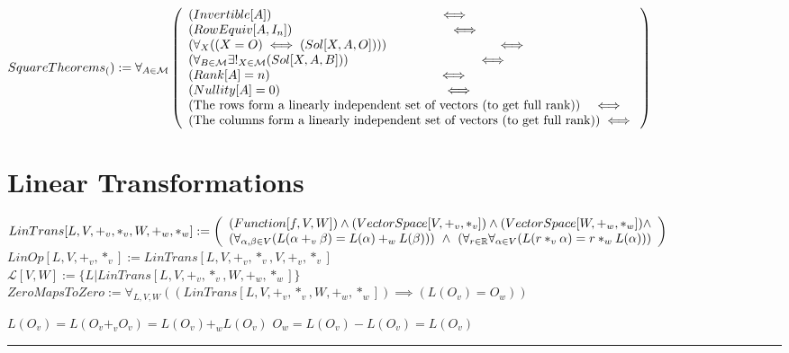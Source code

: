 \documentclass{book}
\newcommand{\abr}{:=}
\begin{document}
$SquareTheorems_() \abr \forall_{A \in \mathcal{M}}\left(\begin{array}{ll}
  (Invertible[A]) \hfill \iff \hfill \\
  (RowEquiv[A, I_n]) \hfill \iff \hfill \\
  (\forall_{X}((X = O) \iff (Sol[X, A, O]))) \hfill \iff \hfill \\
  (\forall_{B \in \mathcal{M}} \exists!_{X \in \mathcal{M}}(Sol[X, A, B])) \hfill \iff \hfill \\
  (Rank[A] = n) \hfill \iff \hfill \\
  (Nullity[A] = 0) \hfill \iff \hfill \\
  (\text{The rows form a linearly independent set of vectors (to get full rank)}) \hfill \iff \hfill \\
  (\text{The columns form a linearly independent set of vectors (to get full rank)}) \hfill \iff \hfill \\
\end{array}\right)$ \\

\section{Linear Transformations}
$LinTrans[L, V, +_v, *_v, W, +_w, *_w] \abr \left(\begin{array}{ll}
  (Function[f, V, W]) \hfill \land \hfill (VectorSpace[V, +_v, *_v]) \hfill \land \hfill (VectorSpace[W, +_w, *_w]) \hfill \land \hfill \\
  (\forall_{\alpha, \beta \in V}(L(\alpha +_v \beta) = L(\alpha) +_w L(\beta))) \hfill \land \hfill (\forall_{r \in \mathbb{R}} \forall_{\alpha \in V}(L(r *_v \alpha) = r *_w L(\alpha)))
\end{array}\right)$ \\
$LinOp[L, V, +_v, *_v] \abr LinTrans[L, V, +_v, *_v, V, +_v, *_v]$ \\
$\mathcal{L}[V, W] \abr \{L | LinTrans[L, V, +_v, *_v, W, +_w, *_w]\}$ \\

$ZeroMapsToZero \abr \forall_{L, V, W}((LinTrans[L, V, +_v, *_v, W, +_w, *_w]) \implies (L(O_v) = O_w))$
\begin{enumerate}
  \lit $L(O_v) = L(O_v +_v O_v) = L(O_v) +_w L(O_v)$
  \lit $O_w = L(O_v) - L(O_v) = L(O_v)$
\end{enumerate} \vspace{.75mm} \hrule \vspace{.75mm} \ \\ 
\end{document}
